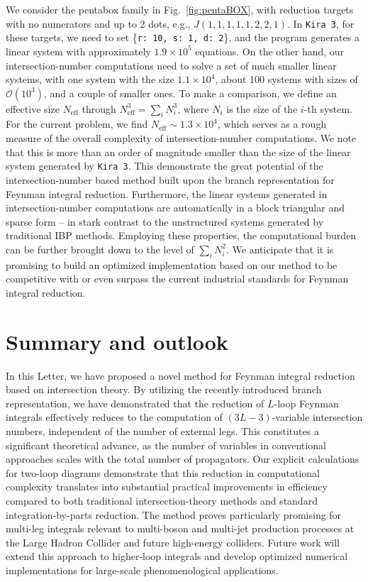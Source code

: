 \documentclass[reprint,superscriptaddress]{revtex4-2}
\begin{document}
We consider the pentabox family in Fig.~\ref{fig:pentaBOX}, with reduction targets with no numerators and up to 2 dots, e.g., $J(1, 1, 1, 1, 1, 2, 2, 1)$. In \texttt{Kira 3}, for these targets, we need to set \{\texttt{r:\,10, s:\,1, d:\,2}\}, and the program generates a linear system with approximately $1.9 \times 10^5$ equations. On the other hand, our intersection-number computations need to solve a set of much smaller linear systems, with one system with the size $1.1 \times 10^4$, about 100 systems with sizes of $\mathcal{O}(10^3)$, and a couple of smaller ones. To make a comparison, we define an effective size $N_{\text{eff}}$ through $N_{\text{eff}}^3=\sum_{i} N_i^3$, where $N_i$ is the size of the $i$-th system. For the current problem, we find $N_{\mathrm{eff}} \sim 1.3\times 10^4$, which serves as a rough measure of the overall complexity of intersection-number computations. We note that this is more than an order of magnitude smaller than the size of the linear system generated by \texttt{Kira 3}. This demonstrate the great potential of the intersection-number based method built upon the branch representation for Feynman integral reduction. Furthermore, the linear systems generated in intersection-number computations are automatically in a block triangular and sparse form -- in stark contrast to the unstructured systems generated by traditional IBP methods. Employing these properties, the computational burden can be further brought down to the level of $\sum_{i} N_i^2$. We anticipate that it is promising to build an optimized implementation based on our method to be competitive with or even surpass the current industrial standards for Feynman integral reduction.


\section{Summary and outlook}\label{sec:summary}

In this Letter, we have proposed a novel method for Feynman integral reduction based on intersection theory. By utilizing the recently introduced branch representation, we have demonstrated that the reduction of $L$-loop Feynman integrals effectively reduces to the computation of $(3L-3)$-variable intersection numbers, independent of the number of external legs. This constitutes a significant theoretical advance, as the number of variables in conventional approaches scales with the total number of propagators. Our explicit calculations for two-loop diagrams demonstrate that this reduction in computational complexity translates into substantial practical improvements in efficiency compared to both traditional intersection-theory methods and standard integration-by-parts reduction. The method proves particularly promising for multi-leg integrals relevant to multi-boson and multi-jet production processes at the Large Hadron Collider and future high-energy colliders. Future work will extend this approach to higher-loop integrals and develop optimized numerical implementations for large-scale phenomenological applications.
\end{document}

